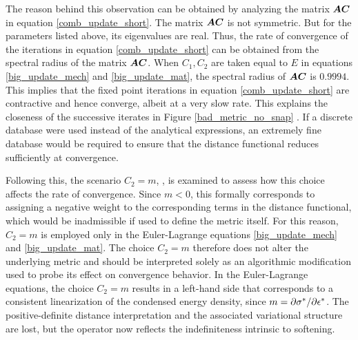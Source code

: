 \documentclass[10pt]{cas-sc}
\begin{document}
The reason behind this observation can be obtained by analyzing the matrix $\mbox{\boldmath $A$} \mbox{\boldmath $C$}$ in equation \eqref{comb_update_short}. The matrix $\mbox{\boldmath $A$} \mbox{\boldmath $C$}$ is not symmetric. But for the parameters listed above, its eigenvalues are real. Thus, the rate of convergence of the iterations in equation \eqref{comb_update_short} can be obtained from the spectral radius of the matrix $\mbox{\boldmath $A$}  \mbox{\boldmath $C$}$. When $C_1,C_2$ are taken equal to $E$ in equations \eqref{big_update_mech} and \eqref{big_update_mat}, the spectral radius of $\mbox{\boldmath $A$} \mbox{\boldmath $C$}$ is $0.9994$. This implies that the fixed point iterations in equation \eqref{comb_update_short} are contractive and hence converge, albeit at a very slow rate. This explains the closeness of the successive iterates in Figure \ref{bad_metric_no_snap} . If a discrete database were used instead of the analytical expressions, an extremely fine database would be required to ensure that the distance functional reduces sufficiently at convergence. 

Following this, the scenario $C_2 = m$, , is examined to assess how this choice affects the rate of convergence. Since $m < 0$, this formally corresponds to assigning a negative weight to the corresponding terms in the distance functional, which would be inadmissible if used to define the metric itself. For this reason, $C_2 = m$ is employed only in the Euler-Lagrange equations \eqref{big_update_mech} and \eqref{big_update_mat}.  The choice $C_2 = m$ therefore does not alter the underlying metric and should be interpreted solely as an algorithmic modification used to probe its effect on convergence behavior. In the Euler-Lagrange equations, the choice $C_2=m$ results in a left-hand side that corresponds to a consistent linearization of the condensed energy density, since $m=\partial {\sigma}^*/ \partial {\epsilon} ^*$. The positive-definite distance interpretation and the associated variational structure are lost, but the operator now reflects the indefiniteness intrinsic to softening.
\end{document}
